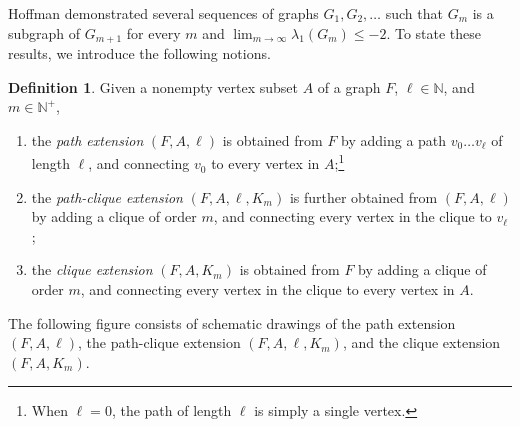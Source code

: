 \documentclass[11pt]{article}
\theoremstyle{definition}
\newtheorem{definition}[theorem]{Definition}
\theoremstyle{remark}
\newcommand{\la}{\lambda}
\newcommand{\N}{\mathbb{N}}
\begin{document}
Hoffman demonstrated several sequences of graphs $G_1, G_2, \dots$ such that $G_m$ is a subgraph of $G_{m+1}$ for every $m$ and $\lim_{m \to \infty} \la_1(G_m) \le -2$. To state these results, we introduce the following notions.

\begin{definition} \label{def:extension}
    Given a nonempty vertex subset $A$ of a graph $F$, $\ell \in \N$, and $m \in \N^+$,
    \begin{enumerate}[label=(\alph*)]
        \item the \emph{path extension} $(F, A, \ell)$ is obtained from $F$ by adding a path $v_0 \dots v_\ell$ of length $\ell$, and connecting $v_0$ to every vertex in $A$;\footnote{When $\ell = 0$, the path of length $\ell$ is simply a single vertex.}
        \item the \emph{path-clique extension} $(F, A, \ell, K_m)$ is further obtained from $(F, A, \ell)$ by adding a clique of order $m$, and connecting every vertex in the clique to $v_\ell$;
        \item the \emph{clique extension} $(F, A, K_m)$ is obtained from $F$ by adding a clique of order $m$, and connecting every vertex in the clique to every vertex in $A$.
    \end{enumerate}
\end{definition}

The following figure consists of schematic drawings of the path extension $(F, A, \ell)$, the path-clique extension $(F, A, \ell, K_m)$, and the clique extension $(F, A, K_m)$.
\end{document}
